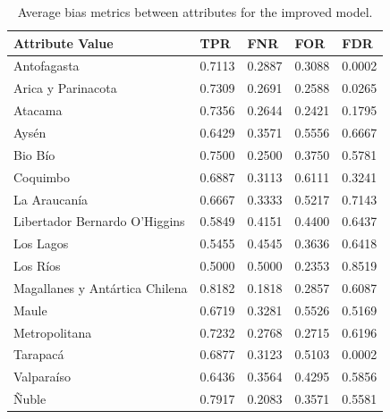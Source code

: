 \documentclass[fleqn,10pt]{wlscirep}
\begin{document}
\begin{table}[ht]
\centering
\begin{tabular}{|p{3.5cm}|p{1cm}|p{1cm}|p{1cm}|p{1cm}|}
\hline

    \textbf{Attribute Value} &      \textbf{TPR} &      \textbf{FNR} &    \textbf{FOR} &    \textbf{FDR} \\ \hline

                   Antofagasta &   0.7113 &   0.2887 & 0.3088 & 0.0002 \\
            Arica y Parinacota &   0.7309 &   0.2691 & 0.2588 & 0.0265 \\
                       Atacama &   0.7356 &   0.2644 & 0.2421 & 0.1795 \\
                         Aysén &   0.6429 &   0.3571 & 0.5556 & 0.6667 \\
                       Bio Bío &   0.7500 &   0.2500 & 0.3750 & 0.5781 \\
                      Coquimbo &   0.6887 &   0.3113 & 0.6111 & 0.3241 \\
                  La Araucanía &   0.6667 &   0.3333 & 0.5217 & 0.7143 \\
 Libertador Bernardo O'Higgins &   0.5849 &   0.4151 & 0.4400 & 0.6437 \\
                     Los Lagos &   0.5455 &   0.4545 & 0.3636 & 0.6418 \\
                      Los Ríos &   0.5000 &   0.5000 & 0.2353 & 0.8519 \\
Magallanes y Antártica Chilena &   0.8182 &   0.1818 & 0.2857 & 0.6087 \\
                         Maule &   0.6719 &   0.3281 & 0.5526 & 0.5169 \\
                 Metropolitana &   0.7232 &   0.2768 & 0.2715 & 0.6196 \\
                      Tarapacá &   0.6877 &   0.3123 & 0.5103 & 0.0002 \\
                    Valparaíso &   0.6436 &   0.3564 & 0.4295 & 0.5856 \\
                         Ñuble &   0.7917 & 0.2083 & 0.3571 & 0.5581 \\

\hline
\end{tabular}
\caption{Average bias metrics between attributes for the improved model.}
\end{table}



\clearpage

\end{document}
